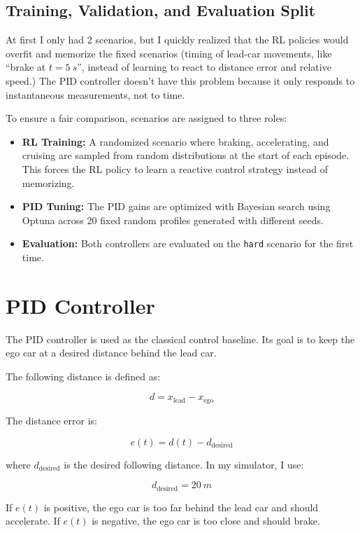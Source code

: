\documentclass{article}
\begin{document}
\subsection*{Training, Validation, and Evaluation Split}

At first I only had 2 scenarios, but I quickly realized that the RL policies would overfit and memorize the fixed scenarios (timing of lead-car movements, like ``brake at $t = \SI{5}{s}$'', instead of learning to react to distance error and relative speed.) The PID controller doesn't have this problem because it only responds to instantaneous measurements, not to time.

To ensure a fair comparison, scenarios are assigned to three roles:

\begin{itemize}
    \item \textbf{RL Training:} A randomized scenario where braking, accelerating, and cruising are sampled from random distributions at the start of each episode. This forces the RL policy to learn a reactive control strategy instead of memorizing.
    \item \textbf{PID Tuning:} The PID gains are optimized with Bayesian search using Optuna across 20 fixed random profiles generated with different seeds. 
    \item \textbf{Evaluation:} Both controllers are evaluated on the \texttt{hard} scenario for the first time. 
\end{itemize}


\section{PID Controller}

The PID controller is used as the classical control baseline. Its goal is to keep the ego car at a desired distance behind the lead car.

The following distance is defined as:

\[
d = x_{\text{lead}} - x_{\text{ego}}
\]

The distance error is:

\[
e(t) = d(t) - d_{\text{desired}}
\]

where $d_{\text{desired}}$ is the desired following distance. In my simulator, I use:

\[
d_{\text{desired}} = \SI{20}{m}
\]

If $e(t)$ is positive, the ego car is too far behind the lead car and should accelerate. If $e(t)$ is negative, the ego car is too close and should brake.
\end{document}
